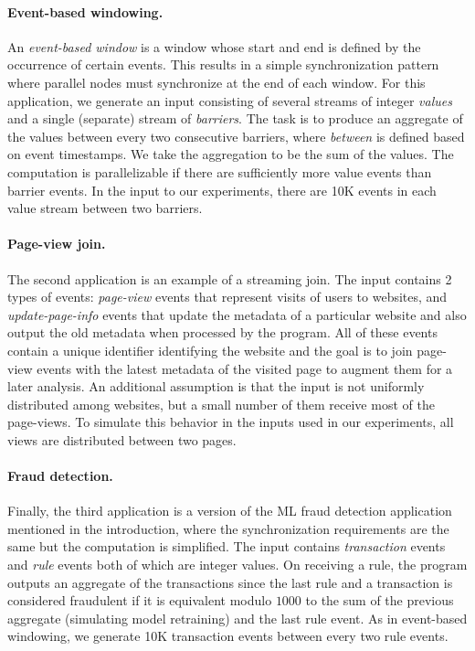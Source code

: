 \paragraph{Event-based windowing.}
An \emph{event-based window} is a window whose start and end is defined by the occurrence of certain events.
This results in a simple synchronization pattern where parallel nodes must synchronize at the end of each window.
For this application, we generate an input consisting of several streams of integer \emph{values} and a single (separate) stream of \emph{barriers}. The task is to
produce an aggregate of the values between every two consecutive
barriers, where \emph{between} is defined based on event timestamps.
We take the aggregation to be the sum of the values.
The computation is parallelizable if there are sufficiently more value events than barrier events. In the input to our experiments, there are 10K events in each value stream between two barriers.

\paragraph{Page-view join.}
The second application is an example of a streaming join.
The input contains 2 types
of events: \emph{page-view} events that represent visits of users to websites,
and \emph{update-page-info} events that update
the metadata of a particular website and also output the
old metadata when processed by the program. All of these
events contain a unique identifier identifying the website and the
goal is to join page-view events with the latest metadata of the
visited page to augment them for a later analysis. An additional
assumption is that the input is not uniformly distributed among
websites, but a small number of them receive most of the page-views.
To simulate this behavior in the inputs used in our experiments,
all views are distributed between two pages.

\paragraph{Fraud detection.}
Finally, the third application is a version of the
ML fraud detection application mentioned in the introduction, where the synchronization requirements are the same but the computation is simplified. The
input contains \emph{transaction} events and \emph{rule} events
both of which are integer values. On receiving a rule, the program
outputs an aggregate of the transactions since the last rule and a transaction is considered
fraudulent if it is equivalent modulo $1000$ to the sum of the previous aggregate (simulating model retraining)
and the last rule event. As in event-based windowing, we generate 10K transaction events between every two rule events.


